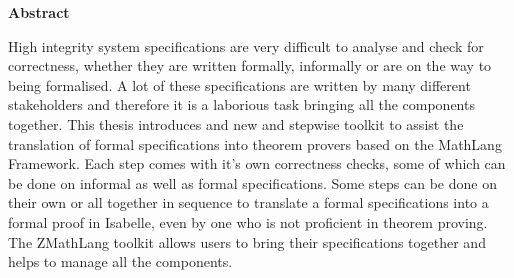 \begin{center}
\LARGE\textbf {Abstract}
\end{center}
\vspace{1cm}

\begin{spacing}{1} 
\noindent
High integrity system specifications are very difficult to analyse and check for
correctness, whether they are written formally, informally or are on the way to
being formalised. A lot of these specifications are written by many different
stakeholders and therefore it is a laborious task bringing all the components
together. This thesis introduces and new and stepwise toolkit to assist the
translation of formal specifications into theorem provers based on the MathLang Framework. Each step comes with
it's own correctness checks, some of which can be done on informal as well as
formal specifications. Some steps can be done on their own
or all together in sequence to translate a formal specifications into a formal
proof in Isabelle, even by one who is not proficient in theorem proving. The
ZMathLang toolkit allows users to bring their specifications together and helps
to manage all the components.

\end{spacing}